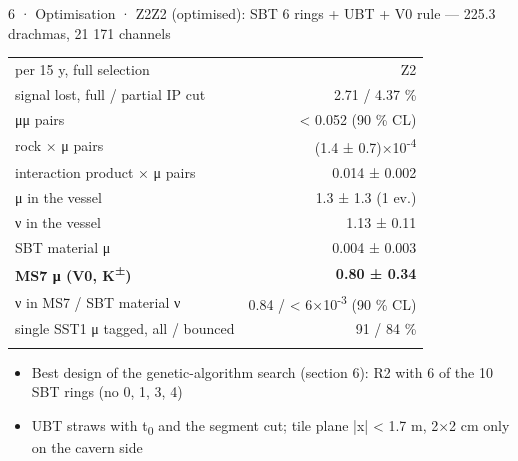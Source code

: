 \begin{btframe}{6 · Optimisation · Z2}{Z2 (optimised): SBT 6 rings + UBT + V0 rule — 225.3 drachmas, 21 171 channels}
{\par}
\vspace{2.46pt}
\noindent \begin{minipage}[c]{0.5\linewidth}
{\fontsize{5.31pt}{6.90pt}\selectfont\setlength{\tabcolsep}{3.72pt}\renewcommand{\arraystretch}{1.42}
\begin{tabular}{lr}
\textcolor{muted}{per 15 y, full selection} & \textcolor{muted}{Z2} \\\headrule
signal lost, full / partial IP cut & 2.71 / 4.37 \% \\\rowrule
μμ pairs & < 0.052 (90 \% CL) \\\rowrule
rock × μ pairs & (1.4 ± 0.7)×10\textsuperscript{-4} \\\rowrule
interaction product × μ pairs & 0.014 ± 0.002 \\\rowrule
μ in the vessel & 1.3 ± 1.3 (1 ev.) \\\rowrule
ν in the vessel & 1.13 ± 0.11 \\\rowrule
SBT material μ & 0.004 ± 0.003 \\\rowrule
\rowcolor{tint}\bfseries MS7 μ (V0, K\textsuperscript{±}) & \bfseries 0.80 ± 0.34 \\\rowrule
ν in MS7 / SBT material ν & 0.84 / < 6×10\textsuperscript{-3} (90 \% CL) \\\rowrule
single SST1 μ tagged, all / bounced & 91 / 84 \% \\\rowrule
\end{tabular}\par}
\end{minipage}%
\hfill%
\begin{minipage}[c]{0.5\linewidth}
{\fontsize{6.15pt}{8.60pt}\selectfont
\begin{itemize}
  \item Best design of the genetic-algorithm search (section 6): R2 with 6 of the 10 SBT rings (no 0, 1, 3, 4)
  \item UBT straws with t\textsubscript{0} and the segment cut; tile plane |x| < 1.7 m, 2×2 cm only on the cavern side

\end{itemize}}
\end{minipage}
\end{btframe}
